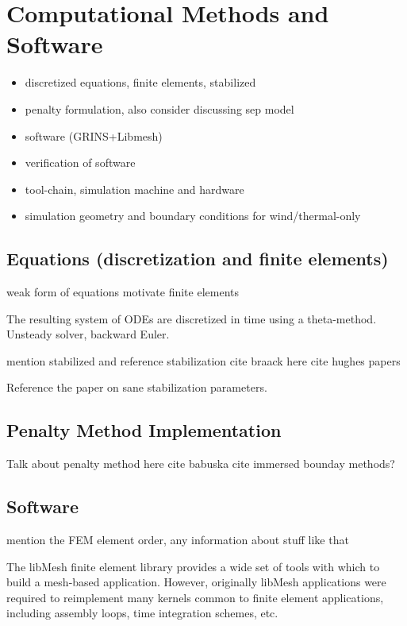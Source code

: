 \section{Computational Methods and Software}
\label{sec:software}

\begin{itemize}
\item discretized equations, finite elements, stabilized
\item penalty formulation, also consider discussing sep model
\item software (GRINS+Libmesh)
\item verification of software
\item tool-chain, simulation machine and hardware
\item simulation geometry and boundary conditions for wind/thermal-only
\end{itemize}

\subsection{Equations (discretization and finite elements)}

weak form of equations
motivate finite elements

The resulting system of ODEs are discretized in time using a theta-method. 
Unsteady solver, backward Euler. 

mention stabilized and reference stabilization
cite braack here
cite hughes papers

Reference the paper on sane stabilization parameters. 

\subsection{Penalty Method Implementation}

Talk about penalty method here
cite babuska
cite immersed bounday methods?

\subsection{Software}

mention the FEM element order, any information about 
stuff like that

The libMesh\cite{libMeshPaper} finite element library
provides a wide set of tools with which to build a mesh-based
application. However, originally libMesh applications were required to
reimplement many kernels common to finite element applications,
including assembly loops, time integration schemes, etc. 

